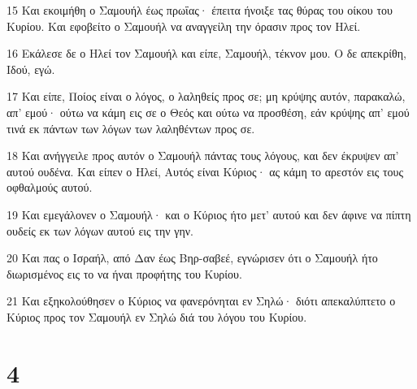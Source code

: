 \par 15 Και εκοιμήθη ο Σαμουήλ έως πρωΐας· έπειτα ήνοιξε τας θύρας του οίκου του Κυρίου. Και εφοβείτο ο Σαμουήλ να αναγγείλη την όρασιν προς τον Ηλεί.
\par 16 Εκάλεσε δε ο Ηλεί τον Σαμουήλ και είπε, Σαμουήλ, τέκνον μου. Ο δε απεκρίθη, Ιδού, εγώ.
\par 17 Και είπε, Ποίος είναι ο λόγος, ο λαληθείς προς σε; μη κρύψης αυτόν, παρακαλώ, απ' εμού· ούτω να κάμη εις σε ο Θεός και ούτω να προσθέση, εάν κρύψης απ' εμού τινά εκ πάντων των λόγων των λαληθέντων προς σε.
\par 18 Και ανήγγειλε προς αυτόν ο Σαμουήλ πάντας τους λόγους, και δεν έκρυψεν απ' αυτού ουδένα. Και είπεν ο Ηλεί, Αυτός είναι Κύριος· ας κάμη το αρεστόν εις τους οφθαλμούς αυτού.
\par 19 Και εμεγάλονεν ο Σαμουήλ· και ο Κύριος ήτο μετ' αυτού και δεν άφινε να πίπτη ουδείς εκ των λόγων αυτού εις την γην.
\par 20 Και πας ο Ισραήλ, από Δαν έως Βηρ-σαβεέ, εγνώρισεν ότι ο Σαμουήλ ήτο διωρισμένος εις το να ήναι προφήτης του Κυρίου.
\par 21 Και εξηκολούθησεν ο Κύριος να φανερόνηται εν Σηλώ· διότι απεκαλύπτετο ο Κύριος προς τον Σαμουήλ εν Σηλώ διά του λόγου του Κυρίου.

\chapter{4}

